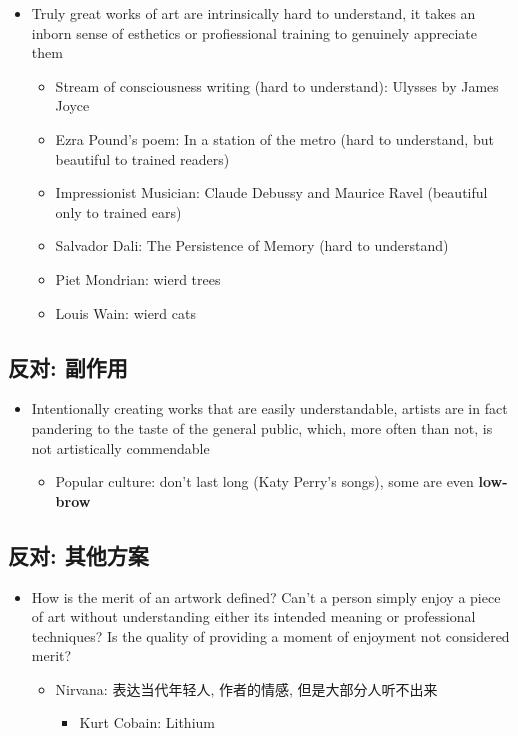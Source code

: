 \documentclass{article}
\begin{document}
      \begin{itemize}
        \item Truly great works of art are intrinsically hard to understand,
        it takes an inborn sense of esthetics or profiessional training to
        genuinely appreciate them
        \begin{itemize}
          \item Stream of consciousness writing (hard to understand):
          Ulysses by James Joyce
          \item Ezra Pound's poem: In a station of the metro
          (hard to understand, but beautiful to trained readers)
          \item Impressionist Musician: Claude Debussy and Maurice Ravel
          (beautiful only to trained ears)
          \item Salvador Dali: The Persistence of Memory (hard to understand)
          \item Piet Mondrian: wierd trees
          \item Louis Wain: wierd cats
        \end{itemize}
      \end{itemize}

    \subsection{反对: 副作用}

      \begin{itemize}
        \item Intentionally creating works that are easily understandable,
        artists are in fact pandering to the taste of the general public,
        which, more often than not, is not artistically commendable
        \begin{itemize}
          \item Popular culture: don't last long (Katy Perry's songs), some
          are even \textbf{low-brow}
        \end{itemize}
      \end{itemize}

    \subsection{反对: 其他方案}

      \begin{itemize}
        \item How is the merit of an artwork defined? Can't a person simply
        enjoy a piece of art without understanding either its intended
        meaning or professional techniques? Is the quality of providing
        a moment of enjoyment not considered merit?
        \begin{itemize}
          \item Nirvana: 表达当代年轻人, 作者的情感, 但是大部分人听不出来
          \begin{itemize}
            \item Kurt Cobain: Lithium
          \end{itemize}
        \end{itemize}
      \end{itemize}
\end{document}
